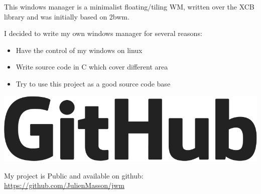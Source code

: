 \documentclass[letterpaper]{jm-cv} %
\begin{document}
\medskip
{}
\medskip

{\large{\color{maingray}\bullet}}

This windows manager is a minimalist floating/tiling WM, written over the XCB library and was initially based on 2bwm.

\begin{minipage}{.7\textwidth}
  I decided to write my own windows manager for several reasons:
  \begin{itemize}
  \item[\color{mainblue}\faArrowRight] Have the control of my windows on linux
  \item[\color{mainblue}\faArrowRight] Write source code in C which cover different area
  \item[\color{mainblue}\faArrowRight] Try to use  this project as a good source code base
  \end{itemize}
\end{minipage}%
\begin{minipage}{.3\textwidth}
  \center
  \includegraphics[scale=0.10]{logo-github.png}
\end{minipage}
\vspace{0.2cm}

My project is Public and available on github:\\
\href{https://github.com/JulienMasson/jwm}{https://github.com/JulienMasson/jwm}
\end{document}
